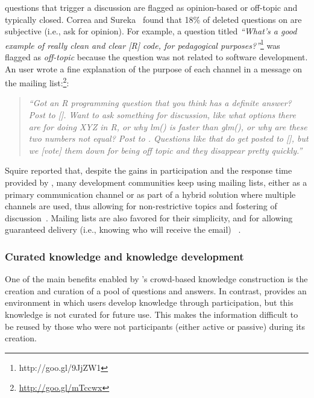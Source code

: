 \SO questions that trigger a discussion are flagged as opinion-based or off-topic and typically closed. Correa and Sureka~\cite{Correa2014} found that 18\% of deleted questions on \SO are subjective (i.e., ask for opinion).
For example, a question titled \textit{``What's a good example of really clean and clear [R] code, for pedagogical purposes?''}\footnote{http://goo.gl/9JjZW1} was flagged as \textit{off-topic} because the question was not related to software development.
An \RH user wrote a fine explanation of the purpose of each channel in a message on the mailing list:\footnote{\url{http://goo.gl/mTccwx}}:
    \begin{quote}
        \textit{``Got an R programming question that you think has a definite answer? Post to [\SO]. Want to ask something for discussion, like what options there are for doing XYZ in R, or why lm() is faster than glm(), or why are these two numbers not equal? Post to \RH. Questions like that do get posted to [\SO], but we [vote] them down for being off topic and they disappear pretty quickly.''}
    \end{quote}

Squire reported that, despite the gains in participation and the response time provided by \SO, many development communities keep using mailing lists, either as
a primary communication channel or as part of a hybrid solution where multiple channels are used, thus allowing for non-restrictive topics and fostering of
discussion~\cite{Squire2015a}.
Mailing lists are also favored for their simplicity, and for allowing guaranteed delivery (i.e., knowing who will receive the email) ~\cite{Zhang2015}.


\subsubsection{Curated knowledge and knowledge development}

One of the main benefits enabled by \SO's crowd-based knowledge construction is the creation and curation of a pool of questions and answers. In contrast, \RH provides an environment in which users
    develop knowledge through participation, but this knowledge is not curated for future use. This makes the information difficult to be reused by those who were not
    participants (either active or passive) during its creation.


